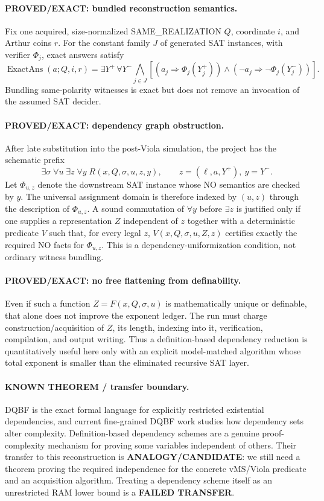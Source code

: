 \documentclass[11pt]{article}
\begin{document}
\paragraph{PROVED/EXACT: bundled reconstruction semantics.} Fix one acquired, size-normalized SAME\_REALIZATION $Q$, coordinate $i$, and Arthur coins $r$. For the constant family $J$ of generated SAT instances, with verifier $\Phi_j$, exact answers satisfy
\[\operatorname{ExactAns}(a;Q,i,r)=\exists Y^+\,\forall Y^-\bigwedge_{j\in J}[(a_j\Rightarrow\Phi_j(Y_j^+))\wedge(\neg a_j\Rightarrow\neg\Phi_j(Y_j^-))].\]
Bundling same-polarity witnesses is exact but does not remove an invocation of the assumed SAT decider.
\paragraph{PROVED/EXACT: dependency graph obstruction.} After late substitution into the post-Viola simulation, the project has the schematic prefix
\[\boxed{\exists\sigma\;\forall u\;\exists z\;\forall y\;R(x,Q,\sigma,u,z,y)},\qquad z=(\ell,a,Y^+),\ y=Y^-.\]
Let $\Phi_{u,z}$ denote the downstream SAT instance whose NO semantics are checked by $y$. The universal assignment domain is therefore indexed by $(u,z)$ through the description of $\Phi_{u,z}$. A sound commutation of $\forall y$ before $\exists z$ is justified only if one supplies a representation $Z$ independent of $z$ together with a deterministic predicate $V$ such that, for every legal $z$, $V(x,Q,\sigma,u,Z,z)$ certifies exactly the required NO facts for $\Phi_{u,z}$. This is a dependency-uniformization condition, not ordinary witness bundling.
\paragraph{PROVED/EXACT: no free flattening from definability.} Even if such a function $Z=F(x,Q,\sigma,u)$ is mathematically unique or definable, that alone does not improve the exponent ledger. The run must charge construction/acquisition of $Z$, its length, indexing into it, verification, compilation, and output writing. Thus a definition-based dependency reduction is quantitatively useful here only with an explicit model-matched algorithm whose total exponent is smaller than the eliminated recursive SAT layer.
\paragraph{KNOWN THEOREM / transfer boundary.} DQBF is the exact formal language for explicitly restricted existential dependencies, and current fine-grained DQBF work studies how dependency sets alter complexity. Definition-based dependency schemes are a genuine proof-complexity mechanism for proving some variables independent of others. Their transfer to this reconstruction is \textbf{ANALOGY/CANDIDATE}: we still need a theorem proving the required independence for the concrete vMS/Viola predicate and an acquisition algorithm. Treating a dependency scheme itself as an unrestricted RAM lower bound is a \textbf{FAILED TRANSFER}.
\end{document}
